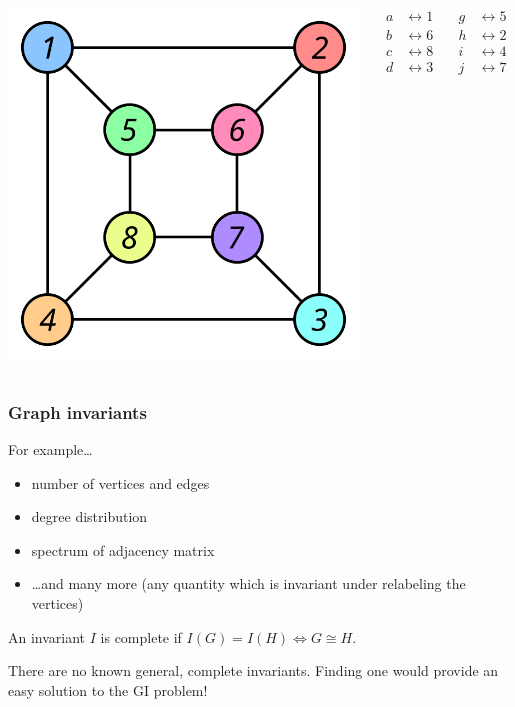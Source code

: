 \documentclass{beamer}
\begin{document}
\begin{frame}
\begin{columns}[c]
    \centering
    \includegraphics[scale=0.36]{Graph_isomorphism_b}

    \centering
     {%
      \begin{align*}
        a &\leftrightarrow 1 &\quad g &\leftrightarrow 5 \\
        b &\leftrightarrow 6 &\quad h &\leftrightarrow 2 \\
        c &\leftrightarrow 8 &\quad i &\leftrightarrow 4 \\
        d &\leftrightarrow 3 &\quad j &\leftrightarrow 7
      \end{align*}
    }
  \end{columns}
\end{frame}

\begin{frame}
  \frametitle{Graph invariants}
  For example\ldots
  \begin{itemize}
    \item number of vertices and edges
    \item degree distribution
    \item spectrum of adjacency matrix
    \item \ldots and many more (any quantity which is invariant under
      relabeling the vertices)
  \end{itemize}
  \pause
  \begin{definition}
    An invariant $I$ is \alert{complete} if $I(G)=I(H) \iff G \cong H$.
  \end{definition}
  There are no known general, complete invariants. Finding one would provide an
  easy solution to the GI problem!
\end{frame}
\end{document}
